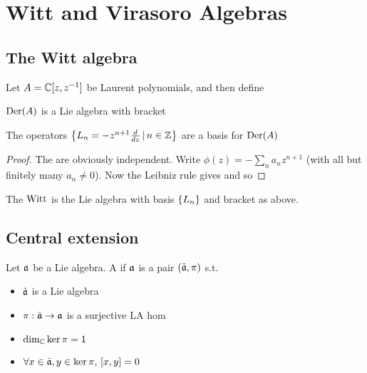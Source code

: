 \documentclass{article}
\begin{document}
\section{Witt and Virasoro Algebras}

\subsection{The Witt algebra}
Let $A = \mbb{C}[z,z^{-1}]$ be Laurent polynomials, and then define

\begin{prop}
$\Der(A)$ is a Lie algebra with bracket 
\end{prop}

\begin{prop}
The operators $\pbrace{L_n = - z^{n+1} \frac{d}{dz} \, | \, n \in \mbb{Z}}$ are a basis for $\Der(A)$
\end{prop}
\begin{proof}
The are obviously independent. Write $\phi(z) = -\sum_n a_n z^{n+1}$ (with all but finitely many $a_n \neq 0$). Now the Leibniz rule gives 
and so 
\end{proof}

\begin{definition}
The  $\Witt$ is the Lie algebra with basis $\pbrace{L_n}$ and bracket as above. 
\end{definition}

\subsection{Central extension}

\begin{definition}
Let $\mf{a}$ be a Lie algebra. A  if $\mf{a}$ is a pair $(\tilde{\mf{a}},\pi)$ s.t. 
\begin{itemize}
    \item $\tilde{\mf{a}}$ is a Lie algebra
    \item $\pi : \tilde{\mf{a}} \to \mf{a}$ is a surjective LA hom 
    \item $\dim_\mbb{C} \ker \pi = 1 $
    \item $\forall x \in \tilde{\mf{a}}, y \in \ker\pi, \, \comm[x]{y} = 0$
\end{itemize}
\end{definition}
\end{document}
